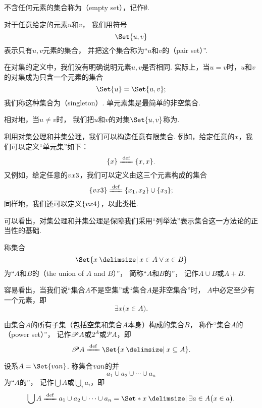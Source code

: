 \begin{definition}
不含任何元素的集合称为（empty set），记作\(\emptyset\).
\end{definition}

\begin{definition}
对于任意给定的元素\(u\)和\(v\)，
我们用符号\[
	\Set{ u, v }
\]表示只有\(u,v\)元素的集合，
并把这个集合称为“\(u\)和\(v\)的（pair set）”.
\end{definition}
在对集的定义中，我们没有明确说明元素\(u,v\)是否相同.
实际上，当\(u=v\)时，\(u\)和\(v\)的对集成为只含一个元素的集合\[
	\Set{ u } = \Set{ u, v };
\]
我们称这种集合为（singleton）.
单元素集是最简单的非空集合.

相对地，当\(u \neq v\)时，
我们把\(u\)和\(v\)的对集\(\Set{u,v}\)称为.

利用对集公理和并集公理，我们可以构造任意有限集合.
例如，给定任意的\(x\)，我们可以定义“单元集”如下：\[
\{x\} \defeq \{x, x\}.
\]
又例如，给定任意的\(v{x}{3}\)，我们可以定义由这三个元素构成的集合
\[
	\{\v{x}{3}\} \defeq \{x_1,x_2\}\cup\{x_3\};
\]
同样地，我们还可以定义\(\{v{x}{4}\}\)，以此类推.

可以看出，对集公理和并集公理是保障我们采用“列举法”表示集合这一方法论的正当性的基础.


\begin{definition}
称集合\[
	\Set{ x \given x \in A \lor x \in B }
\]为“\(A\)和\(B\)的（the union of \(A\) and \(B\)）”，%
简称“\(A\)和\(B\)的”，%
记作\(A \cup B\)或\(A+B\).
\end{definition}

容易看出，当我们说“集合\(A\)不是空集”或“集合\(A\)是非空集合”时，
\(A\)中必定至少有一个元素，即\[
	\exists x \bigl( x \in A \bigr).
\]


\begin{definition}
由集合\(A\)的所有子集（包括空集和集合\(A\)本身）构成的集合\(B\)，%
称作“集合\(A\)的（power set）”，%
记作\(\mathscr{P} A\)或\(2^A\)或\(\mathcal{P}A\)，即\[
	\Powerset A
	\defeq
	\Set{ x \given x \subseteq A }.
\]
\end{definition}


\begin{definition}
设系\(A = \Set{\v{a}{n}}\).
称集合\(v{a}{n}\)的并\[
	a_1 \cup a_2 \cup \dotsb \cup a_n
\]为“\(A\)的”，
记作\(\bigcup A\)或\(\bigcup\limits_i a_i\)，即\[
	\bigcup A
	\defeq
	a_1 \cup a_2 \cup \dotsb \cup a_n
	= \Set*{ x \given \exists a \in A \bigl( x \in a \bigr) }.
\]
\end{definition}


